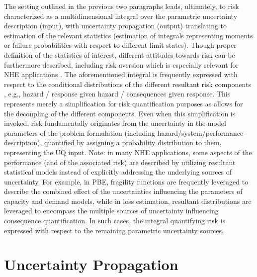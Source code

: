 The setting outlined in the previous two paragraphs leads, ultimately, to risk characterized as a multidimensional integral over the parametric uncertainty description (input), with uncertainty propagation (output) translating to estimation of the relevant statistics (estimation of integrals representing moments or failure probabilities with respect to different limit states). Though proper definition of the statistics of interest, different attitudes towards risk can be furthermore described, including risk aversion which is especially relevant for NHE applications \citep{cha2012riskaverse}. The aforementioned integral is frequently expressed with respect to the conditional distributions of the different resultant risk components \citep{goulet2007evaluation,barbato2013performancebased}, e.g., {hazard / response given hazard / consequences given response}. This represents merely a simplification for risk quantification purposes as allows for the decoupling of the different components. Even when this simplification is invoked, risk fundamentally originates from the uncertainty in the model parameters of the problem formulation (including hazard/system/performance description), quantified by assigning a probability distribution to them, representing the UQ input. Note: in many NHE applications, some aspects of the performance (and of the associated risk) are described by utilizing resultant statistical models instead of explicitly addressing the underlying sources of uncertainty.  For example, in PBE, fragility functions are frequently leveraged to describe the combined effect of the uncertainties influencing the parameters of capacity and demand models, while in loss estimation, resultant distributions are leveraged to encompass the multiple sources of uncertainty influencing consequence quantification. In such cases, the integral quantifying risk is expressed with respect to the remaining parametric uncertainty sources.

\section{Uncertainty Propagation}
\label{sec:uq_propagation}

